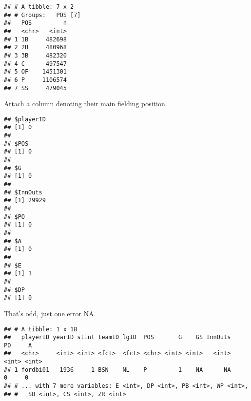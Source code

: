 \documentclass[]{book}
\newenvironment{Shaded}{\begin{snugshade}}{\end{snugshade}}
\newcommand{\KeywordTok}[1]{\textcolor[rgb]{0.13,0.29,0.53}{\textbf{#1}}}
\newcommand{\DecValTok}[1]{\textcolor[rgb]{0.00,0.00,0.81}{#1}}
\newcommand{\StringTok}[1]{\textcolor[rgb]{0.31,0.60,0.02}{#1}}
\newcommand{\OperatorTok}[1]{\textcolor[rgb]{0.81,0.36,0.00}{\textbf{#1}}}
\newcommand{\NormalTok}[1]{#1}
\begin{document}
\begin{verbatim}
## # A tibble: 7 x 2
## # Groups:   POS [7]
##   POS         n
##   <chr>   <int>
## 1 1B     482698
## 2 2B     480968
## 3 3B     482320
## 4 C      497547
## 5 OF    1451301
## 6 P     1106574
## 7 SS     479045
\end{verbatim}

Attach a column denoting their main fielding position.

\begin{Shaded}
\end{Shaded}

\begin{verbatim}
## $playerID
## [1] 0
## 
## $POS
## [1] 0
## 
## $G
## [1] 0
## 
## $InnOuts
## [1] 29929
## 
## $PO
## [1] 0
## 
## $A
## [1] 0
## 
## $E
## [1] 1
## 
## $DP
## [1] 0
\end{verbatim}

That's odd, just one error NA.

\begin{Shaded}
\end{Shaded}

\begin{verbatim}
## # A tibble: 1 x 18
##   playerID yearID stint teamID lgID  POS       G    GS InnOuts    PO     A
##   <chr>     <int> <int> <fct>  <fct> <chr> <int> <int>   <int> <int> <int>
## 1 fordbi01   1936     1 BSN    NL    P         1    NA      NA     0     0
## # ... with 7 more variables: E <int>, DP <int>, PB <int>, WP <int>,
## #   SB <int>, CS <int>, ZR <int>
\end{verbatim}
\end{document}
